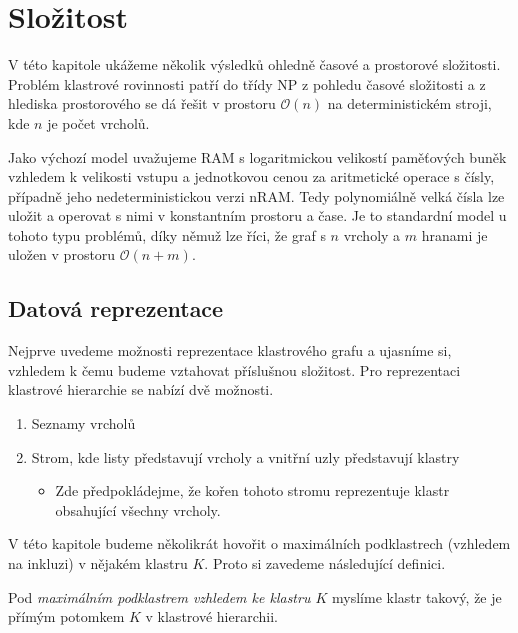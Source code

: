 \chapter{Složitost}
\label{slozitost}

V této kapitole ukážeme několik výsledků ohledně časové a prostorové složitosti.
Problém klastrové rovinnosti patří do třídy NP z pohledu časové složitosti a z hlediska prostorového se dá řešit v prostoru $\mathcal{O}(n)$ na deterministickém stroji, kde $n$ je počet vrcholů.

Jako výchozí model uvažujeme RAM s logaritmickou velikostí paměťových buněk vzhledem k velikosti vstupu a jednotkovou cenou za aritmetické operace s čísly, případně jeho nedeterministickou verzi nRAM. Tedy polynomiálně velká čísla lze uložit a operovat s nimi v konstantním prostoru a čase. Je to standardní model u tohoto typu problémů, díky němuž lze říci, že graf s $n$ vrcholy a $m$ hranami je uložen v prostoru $\mathcal O (n+m)$.

\section{Datová reprezentace}
Nejprve uvedeme možnosti reprezentace klastrového grafu a ujasníme si, vzhledem k čemu budeme vztahovat příslušnou složitost. 
Pro reprezentaci klastrové hierarchie se nabízí dvě možnosti.

\begin{enumerate}
\item Seznamy vrcholů
\item Strom, kde listy představují vrcholy a vnitřní uzly představují klastry
\begin{itemize}
\item Zde předpokládejme, že kořen tohoto stromu reprezentuje klastr obsahující všechny vrcholy.
\end{itemize}
\end{enumerate}

V této kapitole budeme několikrát hovořit o maximálních podklastrech (vzhledem na inkluzi) v nějakém klastru $K$. Proto si zavedeme následující definici.
\begin{defn}
Pod \textit{maximálním podklastrem vzhledem ke klastru $K$} myslíme klastr takový, že je přímým potomkem $K$ v klastrové hierarchii.
\end{defn}

